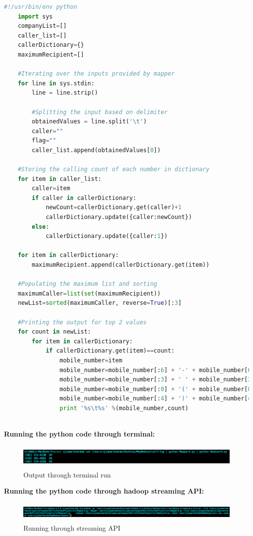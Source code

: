 \documentclass[a4paper, 10pt]{article}
\begin{document}
\begin{lstlisting}[language=Python, caption=Reducer for problem 4]
    #!/usr/bin/env python
    import sys
    companyList=[]
    caller_list=[]
    callerDictionary={}
    maximumRecipient=[]

    #Iterating over the inputs provided by mapper
    for line in sys.stdin:
        line = line.strip()

        #Splitting the input based on delimiter
        obtainedValues = line.split('\t')
        caller=""
        flag=""
        caller_list.append(obtainedValues[0])
    
    #Storing the calling count of each number in dictionary  
    for item in caller_list:
        caller=item
        if caller in callerDictionary:
            newCount=callerDictionary.get(caller)+1
            callerDictionary.update({caller:newCount}) 
        else:
            callerDictionary.update({caller:1})
            
    for item in callerDictionary:
        maximumRecipient.append(callerDictionary.get(item))

    #Populating the maximum list and sorting
    maximumCaller=list(set(maximumRecipient))
    newList=sorted(maximumCaller, reverse=True)[:3]
    
    #Printing the output for top 2 values
    for count in newList:
        for item in callerDictionary:
            if callerDictionary.get(item)==count:
                mobile_number=item
                mobile_number=mobile_number[:6] + '-' + mobile_number[6:]
                mobile_number=mobile_number[:3] + ' ' + mobile_number[3:]
                mobile_number=mobile_number[:0] + '(' + mobile_number[0:]
                mobile_number=mobile_number[:4] + ')' + mobile_number[4:]
                print '%s\t%s' %(mobile_number,count)
                       
\end{lstlisting}

\newpage
\noindent
\textbf{Running the python code through terminal:}
\begin{figure}[!htbp]
    \centering
    \includegraphics[height=1.2cm]{Question4.png}
    \caption{Output through terminal run}
\end{figure}

\noindent
\textbf{Running the python code through hadoop streaming API:}
\begin{figure}[!htbp]
    \centering
    \includegraphics[height=1cm]{Run4.png}
    \caption{Running through streaming API}
\end{figure} 
\end{document}
